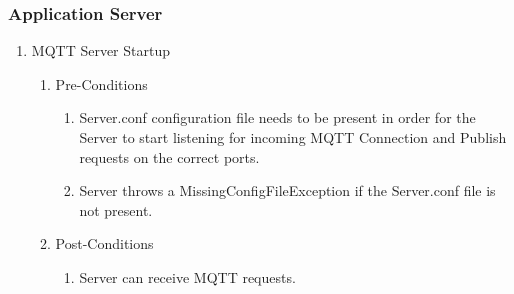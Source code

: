 \documentclass{article}
\begin{document}
	\subsubsection{Application Server}
	\begin{enumerate}
		\item	MQTT Server Startup
		\begin{enumerate}
			\item  Pre-Conditions
			\begin{enumerate}
				\item  	Server.conf configuration file needs to be present in order for the Server to start listening for incoming MQTT Connection and 
				Publish requests on the correct ports.
				\item	Server throws a MissingConfigFileException if the Server.conf file is not present.
			\end{enumerate}
			\item  Post-Conditions		
			\begin{enumerate}
				\item	Server can receive MQTT requests.
			\end{enumerate}
		\end{enumerate}
	\end{enumerate}
\end{document}

